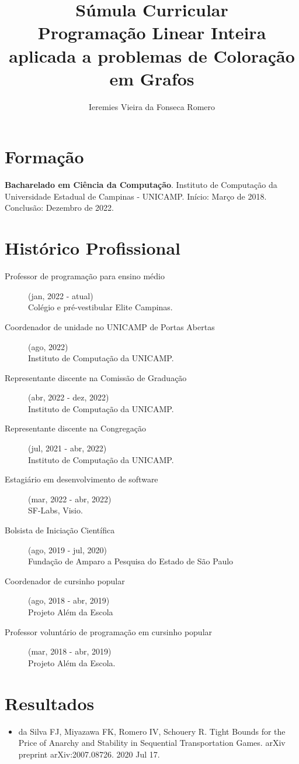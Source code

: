 \documentclass[11pt]{article}
\author{Ieremies Vieira da Fonseca Romero}
\date{}
\title{Súmula Curricular\\\medskip
\large Programação Linear Inteira aplicada a problemas de Coloração em Grafos}
\begin{document}
\maketitle

\section*{Formação}
\label{sec:orgd294247}
\textbf{Bacharelado em Ciência da Computação}. Instituto de Computação da Universidade Estadual de Campinas - UNICAMP.
Início: Março de 2018.
Conclusão: Dezembro de 2022.

\section*{Histórico Profissional}
\label{sec:orga2ea44e}
\begin{description}
\item[{Professor de programação para ensino médio}] (jan, 2022 - atual) \\ Colégio e pré-vestibular Elite Campinas.
\item[{Coordenador de unidade no UNICAMP de Portas Abertas}] (ago, 2022) \\ Instituto de Computação da UNICAMP.
\item[{Representante discente na Comissão de Graduação}] (abr, 2022 - dez, 2022) \\ Instituto de Computação da UNICAMP.
\item[{Representante discente na Congregação}] (jul, 2021 - abr, 2022) \\ Instituto de Computação da UNICAMP.
\item[{Estagiário em desenvolvimento de software}] (mar, 2022 - abr, 2022) \\ SF-Labs, Visio.
\item[{Bolsista de Iniciação Científica}] (ago, 2019 - jul, 2020) \\ Fundação de Amparo a Pesquisa do Estado de São Paulo
\item[{Coordenador de cursinho popular}] (ago, 2018 - abr, 2019) \\ Projeto Além da Escola
\item[{Professor voluntário de programação em cursinho popular}] (mar, 2018 - abr, 2019) \\ Projeto Além da Escola.
\end{description}
\section*{Resultados}
\label{sec:orgd976e2b}
\begin{itemize}
\item da Silva FJ, Miyazawa FK, Romero IV, Schouery R. Tight Bounds for the Price of Anarchy and Stability in Sequential Transportation Games. arXiv preprint arXiv:2007.08726. 2020 Jul 17.
\end{itemize}
\end{document}
